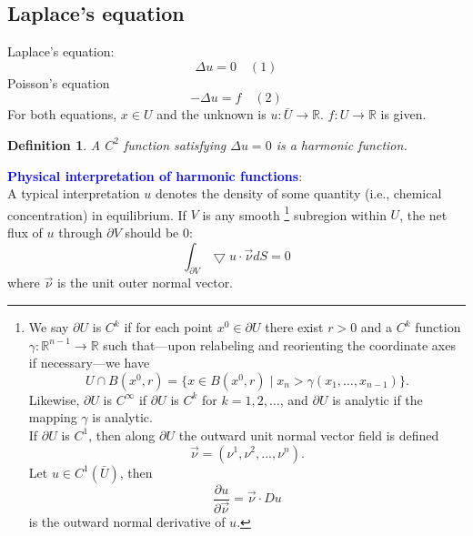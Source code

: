 \documentclass[a4paper,12pt]{report}
\newtheorem{definition}{Definition}[section]
\begin{document}
\subsection{Laplace's equation}
Laplace's equation: \[\Delta u = 0 \quad (1)\] Poisson's equation \[-\Delta u = f \quad (2)\] For both equations, \(x \in U\) and the unknown is \(u: \bar{U} \to \mathbb{R}\). \(f: U \to \mathbb{R}\) is given. 
\begin{definition}
A \(C^2\) function satisfying \(\Delta u = 0\) is a harmonic function. 
\end{definition}
\noindent
\textcolor{blue}{\textbf{Physical interpretation of harmonic functions}}: \\
A typical interpretation \(u\) denotes the density of some quantity (i.e., chemical concentration) in equilibrium. If \(V\) is any smooth \footnote{
We say $\partial U$ is $C^k$ if for each point $x^0 \in \partial U$ 
there exist $r>0$ and a $C^k$ function $\gamma : \mathbb{R}^{n-1} \to \mathbb{R}$ such that—upon relabeling and 
reorienting the coordinate axes if necessary—we have
\[
U \cap B(x^0, r) = \{ x \in B(x^0, r) \mid x_n > \gamma(x_1, \dots, x_{n-1}) \}.
\]
Likewise, $\partial U$ is $C^\infty$ if $\partial U$ is $C^k$ for $k=1,2,\dots$, and $\partial U$ is analytic if the mapping $\gamma$ is analytic.\\
If \(\partial U\) is \(C^1\), then along \(\partial U\) the outward unit normal vector field is defined \[\vec{\nu} = (\nu^1, \nu^2, ..., \nu^n).\]
Let \(u \in C^1(\bar{U})\), then \[\frac{\partial u}{\partial \vec{\nu}} = \vec{\nu} \cdot Du\] is the outward normal derivative of \(u\).} subregion within \(U\), the net flux of \(u\) through \(\partial V\) should be \(0\): \\
\[\int_{\partial V} \bigtriangledown u \cdot \vec{\nu} dS = 0\]
where \(\vec{\nu}\) is the unit outer normal vector.\\
\end{document}

